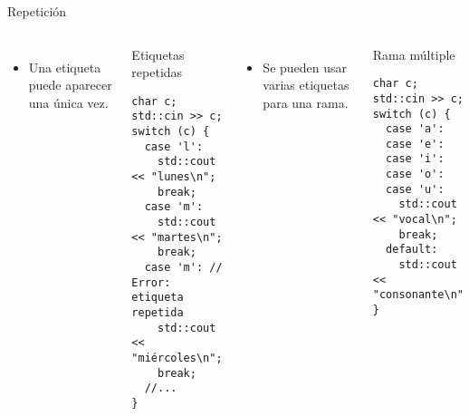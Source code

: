 \begin{frame}[t,fragile]{Repetición}
\begin{columns}[T]

\begin{itemize}
  \item Una etiqueta puede aparecer una única vez.
\end{itemize}

\begin{block}{Etiquetas repetidas}
\begin{lstlisting}
char c;
std::cin >> c;
switch (c) {
  case 'l':
    std::cout << "lunes\n";
    break;
  case 'm':
    std::cout << "martes\n";
    break;
  case 'm': // Error: etiqueta repetida
    std::cout << "miércoles\n";
    break;
  //...  
}
\end{lstlisting}
\end{block}

\begin{itemize}
  \item Se pueden usar varias etiquetas para una rama.
\end{itemize}
\begin{block}{Rama múltiple}
\begin{lstlisting}
char c;
std::cin >> c;
switch (c) {
  case 'a':
  case 'e':
  case 'i':
  case 'o':
  case 'u':
    std::cout << "vocal\n";
    break;
  default:
    std::cout << "consonante\n"
}
\end{lstlisting}
\end{block}

\end{columns}
\end{frame}

